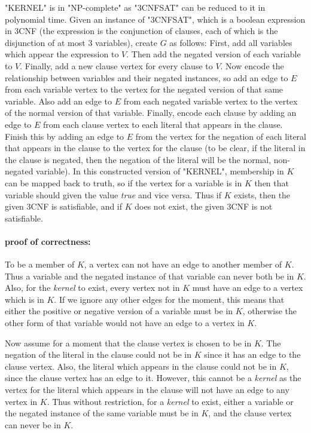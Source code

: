 \documentclass{article}
\begin{document}
\begin{enumerate}
\par "KERNEL" is in "NP-complete" as "3CNFSAT" can be reduced to it in polynomial time. Given an instance of "3CNFSAT", which is a boolean expression in 3CNF (the expression is the conjunction of clauses, each of which is the disjunction of at most 3 variables), create $G$ as follows: First, add all variables which appear the expression to $V$.  Then add the negated version of each variable to $V$.  Finally, add a new clause vertex for every clause to $V$. Now encode the relationship between variables and their negated instances, so add an edge to $E$ from each variable vertex to the vertex for the negated version of that same variable.  Also add an edge to $E$ from each negated variable vertex to the vertex of the normal version of that variable. Finally, encode each clause by adding an edge to $E$ from each clause vertex to each literal that appears in the clause.  Finish this by adding an edge to $E$ from the vertex for the negation of each literal that appears in the clause to the vertex for the clause (to be clear, if the literal in the clause is negated, then the negation of the literal will be the normal, non-negated variable). In this constructed version of "KERNEL", membership in $K$ can be mapped back to truth, so if the vertex for a variable is in $K$ then that variable should given the value \emph{true} and vice versa. Thus if $K$ exists, then the given 3CNF is satisfiable, and if $K$ does not exist, the given 3CNF is not satisfiable.

\paragraph{proof of correctness:} To be a member of $K$, a vertex can not have an edge to another member of $K$.  Thus a variable and the negated instance of that variable can never both be in $K$. Also, for the \emph{kernel} to exist, every vertex not in $K$ must have an edge to a vertex which is in $K$.  If we ignore any other edges for the moment, this means that either the positive or negative version of a variable must be in $K$, otherwise the other form of that variable would not have an edge to a vertex in $K$.

\par Now assume for a moment that the clause vertex is chosen to be in $K$. The negation of the literal in the clause could not be in $K$ since it has an edge to the clause vertex. Also, the literal which appears in the clause could not be in $K$, since the clause vertex has an edge to it. However, this cannot be a \emph{kernel} as the vertex for the literal which appears in the clause will not have an edge to any vertex in $K$. Thus without restriction, for a \emph{kernel} to exist, either a variable or the negated instance of the same variable must be in $K$, and the clause vertex can never be in $K$.


\end{enumerate}
\end{document}
